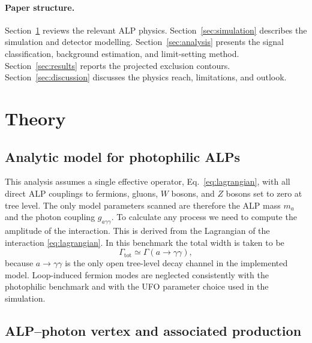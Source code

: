\documentclass[12pt,a4paper]{article}
\newcommand{\gagg}{g_{a\gamma\gamma}}
\newcommand{\ma}{m_a}
\begin{document}
\paragraph{Paper structure.}
Section~\ref{sec:theory} reviews the relevant ALP physics.
Section~\ref{sec:simulation} describes the simulation and detector modelling.
Section~\ref{sec:analysis} presents the signal classification, background
estimation, and limit-setting method.
Section~\ref{sec:results} reports the projected exclusion contours.
Section~\ref{sec:discussion} discusses the physics reach, limitations, and outlook.

\section{Theory}
\label{sec:theory}

\subsection{Analytic model for photophilic ALPs}

This analysis assumes a single effective operator,
Eq.~\eqref{eq:lagrangian}, with all direct ALP couplings to fermions, gluons,
$W$ bosons, and $Z$ bosons set to zero at tree level. The only model
parameters scanned are therefore the ALP mass $\ma$ and the photon coupling
$\gagg$. To calculate any process we need to compute the amplitude of the
interaction. This is derived from the Lagrangian of the interaction
\eqref{eq:lagrangian}. In this benchmark the total width is taken to be
\begin{equation}
    \Gamma_\mathrm{tot} \simeq \Gamma(a\to\gamma\gamma),
    \label{eq:width_assumption}
\end{equation}
because $a\to\gamma\gamma$ is the only open tree-level decay channel in the
implemented model. Loop-induced fermion modes are neglected consistently with
the photophilic benchmark and with the UFO parameter choice used in the
simulation.

\subsection{ALP--photon vertex and associated production}
\end{document}
